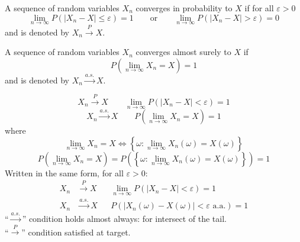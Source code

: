 

\begin{reqproof}
\begin{definition}
    A sequence of random variables $X_n$ converges in probability to $X$ if for all $\varepsilon > 0$
    \[\lim_{n\to \infty} P(\left|X_n - X\right| \leq \varepsilon) = 1 \qquad \text{or} \qquad \lim_{n\to \infty} P(\left|X_n - X\right| > \varepsilon) = 0\]
    and is denoted by $X_n \overset{P}{\longrightarrow} X$.
\end{definition}
\end{reqproof}

\begin{reqproof}
\begin{definition}
    A sequence of random variables $X_n$ converges almost surely to $X$ if
    \[P(\lim_{n \to \infty} X_n = X) = 1\]
    and is denoted by $X_n \overset{a.s.}{\longrightarrow} X$.
\end{definition}
\end{reqproof}

\[X_n \overset{P}{\longrightarrow} X \qquad \lim_{n\to \infty} P(\left|X_n - X\right| < \varepsilon ) = 1\]
\[X_n \overset{a.s.}{\longrightarrow} X \qquad P(\lim_{n \to \infty} X_n = X) = 1\]
where
\[\lim_{n \to \infty} X_n = X \Leftrightarrow \left\{\omega: \lim_{n\to \infty} X_n (\omega) = X(\omega)\right\}\]
\[P(\lim_{n\to \infty} X_n = X) = P(\left\{\omega: \lim_{n \to \infty} X_n (\omega) = X(\omega)\right\})=1\]
Written in the same form, for all $\varepsilon > 0$:
\begin{align*}
    X_n &\overset{P}{\longrightarrow} X & &\lim_{n\to \infty} P(\left|X_n - X\right| < \varepsilon) = 1 \\
    X_n &\overset{a.s.}{\longrightarrow} X & &P(\left|X_n(\omega) - X(\omega)\right| < \varepsilon \text{ a.a.}) = 1
\end{align*}
``$\overset{a.s.}{\longrightarrow}$'' condition holds almost always: for intersect of the tail.
\\``$\overset{P}{\longrightarrow}$'' condition satisfied at target.

